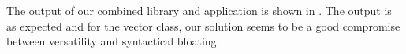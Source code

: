 The output of our combined library and application is shown in .
%
%
The output is as expected and for the vector class, our solution seems to be a good compromise between versatility and syntactical bloating.



